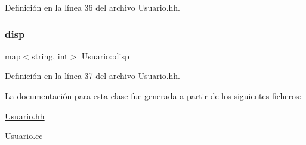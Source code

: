 Definición en la línea 36 del archivo Usuario.\+hh.

\mbox{\label{class_usuario_a4402178ca5b057733c675e3849718e96}} 
\subsubsection{\texorpdfstring{disp}{disp}}
{\footnotesize\ttfamily map$<$string, int$>$ Usuario\+::disp\hspace{0.3cm}{\ttfamily [private]}}



Definición en la línea 37 del archivo Usuario.\+hh.



La documentación para esta clase fue generada a partir de los siguientes ficheros\+:\begin{DoxyCompactItemize}
\item 
\mbox{\hyperlink{_usuario_8hh}{Usuario.\+hh}}\item 
\mbox{\hyperlink{_usuario_8cc}{Usuario.\+cc}}\end{DoxyCompactItemize}
